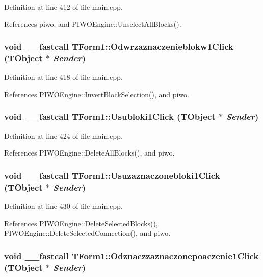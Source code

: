 Definition at line 412 of file main.cpp.

References piwo, and PIWOEngine::UnselectAllBlocks().\hypertarget{classTForm1_af1673c47adc3d228f6e6399c76a226d}{
\subsubsection[Odwrzaznaczenieblokw1Click]{\setlength{\rightskip}{0pt plus 5cm}void \_\-\_\-fastcall TForm1::Odwrzaznaczenieblokw1Click (TObject $\ast$ {\em Sender})}}
\label{classTForm1_af1673c47adc3d228f6e6399c76a226d}




Definition at line 418 of file main.cpp.

References PIWOEngine::InvertBlockSelection(), and piwo.\hypertarget{classTForm1_788905f80f093f21a927242521e0ba78}{
\subsubsection[Usubloki1Click]{\setlength{\rightskip}{0pt plus 5cm}void \_\-\_\-fastcall TForm1::Usubloki1Click (TObject $\ast$ {\em Sender})}}
\label{classTForm1_788905f80f093f21a927242521e0ba78}




Definition at line 424 of file main.cpp.

References PIWOEngine::DeleteAllBlocks(), and piwo.\hypertarget{classTForm1_ec78283bc0f4991e6950955004b60a77}{
\subsubsection[Usuzaznaczonebloki1Click]{\setlength{\rightskip}{0pt plus 5cm}void \_\-\_\-fastcall TForm1::Usuzaznaczonebloki1Click (TObject $\ast$ {\em Sender})}}
\label{classTForm1_ec78283bc0f4991e6950955004b60a77}




Definition at line 430 of file main.cpp.

References PIWOEngine::DeleteSelectedBlocks(), PIWOEngine::DeleteSelectedConnection(), and piwo.\hypertarget{classTForm1_4e73d3a0fa76a760e8c42b99cb7ca967}{
\subsubsection[Odznaczzaznaczonepoaczenie1Click]{\setlength{\rightskip}{0pt plus 5cm}void \_\-\_\-fastcall TForm1::Odznaczzaznaczonepoaczenie1Click (TObject $\ast$ {\em Sender})}}
\label{classTForm1_4e73d3a0fa76a760e8c42b99cb7ca967}




